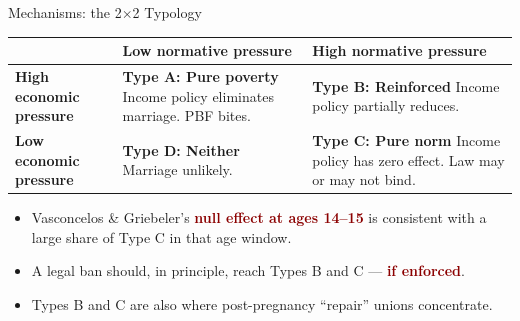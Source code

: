 \documentclass[aspectratio=169,10pt]{beamer}
\newcommand{\hl}[1]{\textcolor{darkred}{\textbf{#1}}}
\begin{document}
\begin{frame}{Mechanisms: the 2$\times$2 Typology}
    \small
    \centering
    \renewcommand{\arraystretch}{1.6}
    \begin{tabular}{l|p{4.5cm}|p{4.5cm}}
         & \textbf{Low normative pressure} & \textbf{High normative pressure} \\
        \hline
        \textbf{High economic pressure} & \textbf{Type A: Pure poverty} \newline Income policy eliminates marriage. PBF bites. & \textbf{Type B: Reinforced} \newline Income policy partially reduces. \\
        \hline
        \textbf{Low economic pressure} & \textbf{Type D: Neither} \newline Marriage unlikely. & \textbf{Type C: Pure norm} \newline Income policy has zero effect. Law may or may not bind. \\
    \end{tabular}

    \vspace{0.4cm}
    \begin{itemize}
        \item Vasconcelos \& Griebeler's \hl{null effect at ages 14--15} is consistent with a large share of Type C in that age window.
        \item A legal ban should, in principle, reach Types B and C --- \hl{if enforced}.
        \item Types B and C are also where post-pregnancy ``repair'' unions concentrate.
    \end{itemize}
\end{frame}
\end{document}
